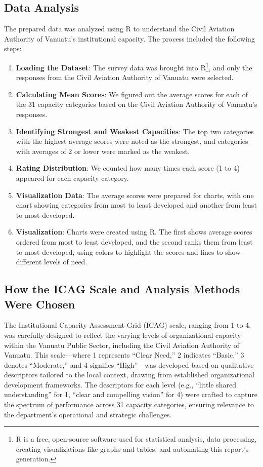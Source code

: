 \documentclass[
  10pt,
]{report}
\providecommand{\tightlist}{%
  \setlength{\itemsep}{0pt}\setlength{\parskip}{0pt}}
\begin{document}
\subsection{Data Analysis}\label{data-analysis}

The prepared data was analyzed using R to understand the Civil Aviation
Authority of Vanuatu's institutional capacity. The process included the
following steps:

\begin{enumerate}
\def\labelenumi{\arabic{enumi}.}
\tightlist
\item
  \textbf{Loading the Dataset}: The survey data was brought into
  R\footnote{R is a free, open-source software used for statistical
    analysis, data processing, creating visualizations like graphs and
    tables, and automating this report's generation.}, and only the
  responses from the Civil Aviation Authority of Vanuatu were selected.
\item
  \textbf{Calculating Mean Scores}: We figured out the average scores
  for each of the 31 capacity categories based on the Civil Aviation
  Authority of Vanuatu's responses.
\item
  \textbf{Identifying Strongest and Weakest Capacities}: The top two
  categories with the highest average scores were noted as the
  strongest, and categories with averages of 2 or lower were marked as
  the weakest.
\item
  \textbf{Rating Distribution}: We counted how many times each score (1
  to 4) appeared for each capacity category.
\item
  \textbf{Visualization Data}: The average scores were prepared for
  charts, with one chart showing categories from most to least developed
  and another from least to most developed.
\item
  \textbf{Visualization}: Charts were created using R. The first shows
  average scores ordered from most to least developed, and the second
  ranks them from least to most developed, using colors to highlight the
  scores and lines to show different levels of need.
\end{enumerate}

\subsection{How the ICAG Scale and Analysis Methods Were
Chosen}\label{how-the-icag-scale-and-analysis-methods-were-chosen}

The Institutional Capacity Assessment Grid (ICAG) scale, ranging from 1
to 4, was carefully designed to reflect the varying levels of
organizational capacity within the Vanuatu Public Sector, including the
Civil Aviation Authority of Vanuatu. This scale---where 1 represents
``Clear Need,'' 2 indicates ``Basic,'' 3 denotes ``Moderate,'' and 4
signifies ``High''---was developed based on qualitative descriptors
tailored to the local context, drawing from established organizational
development frameworks. The descriptors for each level (e.g., ``little
shared understanding'' for 1, ``clear and compelling vision'' for 4)
were crafted to capture the spectrum of performance across 31 capacity
categories, ensuring relevance to the department's operational and
strategic challenges.
\end{document}
